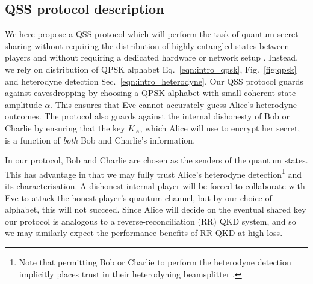 \subsection{QSS protocol description}

We here propose a QSS protocol which will perform the task of quantum secret sharing without requiring the distribution of highly entangled states between players \cite{Kogias2017} and without requiring a dedicated hardware or network setup \cite{Grice2019}. Instead, we rely on distribution of QPSK alphabet Eq.~\ref{eqn:intro_qpsk}, Fig.~\ref{fig:qpsk} and heterodyne detection Sec.~\ref{eqn:intro_heterodyne}. Our QSS protocol guards against eavesdropping by choosing a QPSK alphabet with small coherent state amplitude $\alpha$. This ensures that Eve cannot accurately guess Alice's heterodyne outcomes. The protocol also guards against the internal dishonesty of Bob or Charlie by ensuring that the key $K_A$, which Alice will use to encrypt her secret, is a function of \emph{both} Bob and Charlie's information.

In our protocol, Bob and Charlie are chosen as the senders of the quantum states. This has advantage in that we may fully trust Alice's heterodyne detection\footnote{Note that permitting Bob or Charlie to perform the heterodyne detection implicitly places trust in their heterodyning beamsplitter \cite{Walk2016a}. %
} and its characterisation. A dishonest internal player will be forced to collaborate with Eve to attack the honest player's quantum channel, but by our choice of alphabet, this will not succeed. Since Alice will decide on the eventual shared key our protocol is analogous to a reverse-reconciliation (RR) QKD system, and so we may similarly expect the performance benefits of RR QKD at high loss. 

